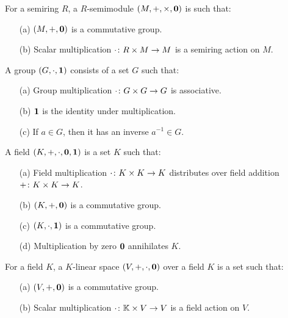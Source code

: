 \documentclass[12pt]{article}
\begin{document}
\begin{definition}[Semimodule]
  For a semiring \(R\), a \(R\)-semimodule
  \(\left(M, +, \times, \mathbf{0}\right)\)
  is such that:
  \begin{enumerate}
    \item[(a)]
      \(\left(M, +, \mathbf{0}\right)\) is a commutative group.

    \item[(b)]
      Scalar multiplication
      \(\cdot \colon R \times M \to M\) is a semiring action on \(M\).

  \end{enumerate}
\end{definition}

\begin{definition}[Group]
  A group \(\left(G, \cdot, \mathbf{1}\right)\) consists of a set \(G\) such that:
  \begin{enumerate}
    \item[(a)]
      Group multiplication \(\cdot \colon G \times G \to G\) is associative.

    \item[(b)]
      \(\mathbf{1}\) is the identity under multiplication.

    \item[(c)]
      If \(a \in G\), then it has an inverse \(a^{-1} \in G\).
  \end{enumerate}
\end{definition}

\begin{definition}[Field]
  A field \(\left(K, +, \cdot, \mathbf{0}, \mathbf{1}\right)\) is a set \(K\) such that:
  \begin{enumerate}
    \item[(a)]
      Field multiplication \(\cdot \colon K \times K \to K\)
      distributes over field addition \(+ \colon K \times K \to K\).

    \item[(b)]
      \(\left(K, +, \mathbf{0}\right)\) is a commutative group.

    \item[(c)]
      \(\left(K, \cdot, \mathbf{1}\right)\) is a commutative group.

    \item[(d)]
      Multiplication by zero \(\mathbf{0}\) annihilates \(K\).
  \end{enumerate}
\end{definition}

\begin{definition}
  For a field \(K\),
  a \(K\)-linear space \(\left(V, +, \cdot, \mathbf{0}\right)\) over a field \(K\)
  is a set such that:
  \begin{enumerate}
    \item[(a)]
      \(\left(V, +, \mathbf{0}\right)\) is a commutative group.

    \item[(b)]
      Scalar multiplication
      \(\cdot \colon \mathbb{K} \times V \to V\) is a field action on \(V\).

  \end{enumerate}
\end{definition}
\end{document}
